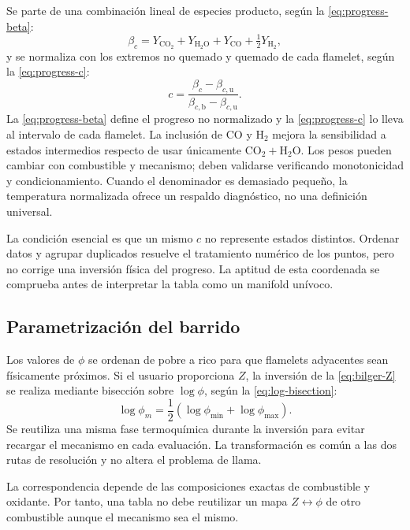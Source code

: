 \documentclass[12pt,a4paper,twoside,openany]{book}
\begin{document}
Se parte de una combinación lineal de especies producto, según la \cref{eq:progress-beta}:
\begin{equation}
  \beta_c=Y_{\mathrm{CO_2}}+Y_{\mathrm{H_2O}}+Y_{\mathrm{CO}}
  +\tfrac{1}{2}Y_{\mathrm{H_2}},
  \label{eq:progress-beta}
\end{equation}
y se normaliza con los extremos no quemado y quemado de cada flamelet, según la \cref{eq:progress-c}:
\begin{equation}
  c=\frac{\beta_c-\beta_{c,\mathrm{u}}}
  {\beta_{c,\mathrm{b}}-\beta_{c,\mathrm{u}}}.
  \label{eq:progress-c}
\end{equation}
La \cref{eq:progress-beta} define el progreso no normalizado y la
\cref{eq:progress-c} lo lleva al intervalo de cada flamelet. La inclusión de CO y
\(\mathrm{H_2}\) mejora la sensibilidad a estados
intermedios respecto de usar únicamente \(\mathrm{CO_2}+\mathrm{H_2O}\). Los
pesos pueden cambiar con combustible y mecanismo; deben validarse verificando
monotonicidad y condicionamiento. Cuando el denominador es demasiado pequeño,
la temperatura normalizada ofrece un respaldo diagnóstico, no una definición
universal.

La condición esencial es que un mismo \(c\) no represente estados distintos.
Ordenar datos y agrupar duplicados resuelve el tratamiento numérico de los
puntos, pero no corrige una inversión física del progreso. La aptitud de esta
coordenada se comprueba antes de interpretar la tabla como un manifold unívoco.

\subsection{Parametrización del barrido}

Los valores de \(\phi\) se ordenan de pobre a rico para que flamelets adyacentes
sean físicamente próximos. Si el usuario proporciona \(Z\), la inversión de la \cref{eq:bilger-Z} se realiza mediante bisección sobre \(\log\phi\), según la \cref{eq:log-bisection}:
\begin{equation}
  \log\phi_{m}=\frac{1}{2}
  (\log\phi_{\min}+\log\phi_{\max}).
  \label{eq:log-bisection}
\end{equation}
Se reutiliza una misma fase termoquímica durante la inversión para evitar
recargar el mecanismo en cada evaluación. La transformación es común a las
dos rutas de resolución y no altera el problema de llama.

La correspondencia depende de las composiciones exactas de combustible y
oxidante. Por tanto, una tabla no debe reutilizar un mapa \(Z\leftrightarrow\phi\)
de otro combustible aunque el mecanismo sea el mismo.
\end{document}
